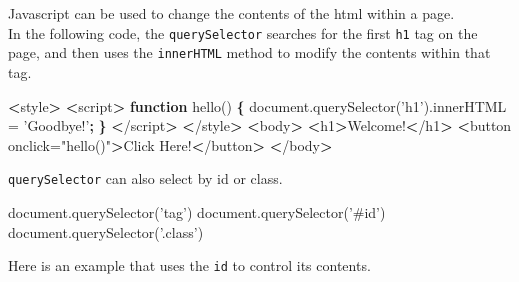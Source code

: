 \documentclass[]{book}
\newenvironment{Shaded}{\begin{snugshade}}{\end{snugshade}}
\newcommand{\KeywordTok}[1]{\textcolor[rgb]{0.13,0.29,0.53}{\textbf{#1}}}
\newcommand{\StringTok}[1]{\textcolor[rgb]{0.31,0.60,0.02}{#1}}
\newcommand{\FunctionTok}[1]{\textcolor[rgb]{0.00,0.00,0.00}{#1}}
\newcommand{\OperatorTok}[1]{\textcolor[rgb]{0.81,0.36,0.00}{\textbf{#1}}}
\newcommand{\ExtensionTok}[1]{#1}
\newcommand{\NormalTok}[1]{#1}
\begin{document}
Javascript can be used to change the contents of the html within a
page.\\
In the following code, the \texttt{querySelector} searches for the first
\texttt{h1} tag on the page, and then uses the \texttt{innerHTML} method
to modify the contents within that tag.

\begin{Shaded}
\begin{Highlighting}[]
\OperatorTok{<}\ExtensionTok{style}\OperatorTok{>}
    \OperatorTok{<}\ExtensionTok{script}\OperatorTok{>}
        \KeywordTok{function}\FunctionTok{ hello()} \KeywordTok{\{}                                      
            \ExtensionTok{document.querySelector}\NormalTok{(}\StringTok{'h1'}\NormalTok{)}\ExtensionTok{.innerHTML}\NormalTok{ = }\StringTok{'Goodbye!'}\KeywordTok{;}
            \KeywordTok{\}}                                                       
    \OperatorTok{<}\NormalTok{/}\ExtensionTok{script}\OperatorTok{>}
\OperatorTok{<}\NormalTok{/}\ExtensionTok{style}\OperatorTok{>}
\OperatorTok{<}\ExtensionTok{body}\OperatorTok{>}
    \OperatorTok{<}\ExtensionTok{h1}\OperatorTok{>}\NormalTok{Welcome!}\OperatorTok{<}\NormalTok{/h1}\OperatorTok{>}                             
    \OperatorTok{<}\ExtensionTok{button}\NormalTok{ onclick=}\StringTok{"hello()"}\OperatorTok{>}\NormalTok{Click Here!}\OperatorTok{<}\NormalTok{/button}\OperatorTok{>}
\OperatorTok{<}\NormalTok{/}\ExtensionTok{body}\OperatorTok{>}
\end{Highlighting}
\end{Shaded}

\texttt{querySelector} can also select by id or class.

\begin{Shaded}
\begin{Highlighting}[]
\ExtensionTok{document.querySelector}\NormalTok{(}\StringTok{'tag'}\NormalTok{)}
\ExtensionTok{document.querySelector}\NormalTok{(}\StringTok{'#id'}\NormalTok{)}
\ExtensionTok{document.querySelector}\NormalTok{(}\StringTok{'.class'}\NormalTok{)}
\end{Highlighting}
\end{Shaded}

Here is an example that uses the \texttt{id} to control its contents.
\end{document}
